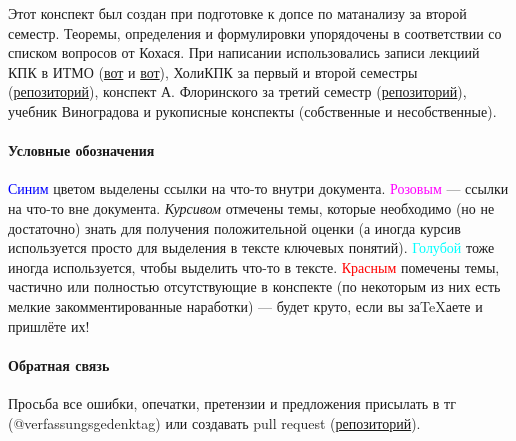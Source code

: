 
Этот конспект был создан при подготовке к допсе по матанализу за второй семестр. Теоремы, определения и формулировки упорядочены в соответствии со списком вопросов от Кохася. При написании использовались записи лекциий КПК в ИТМО (\href{https://youtube.com/playlist?list=PLd7QXkfmSY7avIqoacyLFhwAAfO-JQX7w&si=zLviQ8XKvk3Mrje3}{вот} и \href{https://youtube.com/playlist?list=PLd7QXkfmSY7YppM1nXNRKzXeQN0TYfFBQ&si=TGkLA1tfMZIdTC02}{вот}), ХолиКПК за первый и второй семестры (\href{https://github.com/snitron/ct-itmo}{репозиторий}), конспект А. Флоринского за третий семестр (\href{https://github.com/Alexandr5476/Matanaliz}{репозиторий}), учебник Виноградова и рукописные конспекты (собственные и несобственные).

\paragraph{Условные обозначения}

\textcolor{blue}{Синим} цветом выделены ссылки на что-то внутри документа. \textcolor{magenta}{Розовым} --- ссылки на что-то вне документа. \textit{Курсивом} отмечены темы, которые необходимо (но не достаточно) знать для получения положительной оценки (а иногда курсив используется просто для выделения в тексте ключевых понятий). \textcolor{cyan}{Голубой} тоже иногда используется, чтобы выделить что-то в тексте. \textcolor{red}{Красным} помечены темы, частично или полностью отсутствующие в конспекте (по некоторым из них есть мелкие закомментированные наработки) --- будет круто, если вы за\TeX аете и пришлёте их!

\paragraph{Обратная связь} Просьба все ошибки, опечатки, претензии и предложения присылать в тг (@verfassungsgedenktag) или создавать pull request (\href{https://github.com/verfassungsgedenktag/kpk}{репозиторий}).
